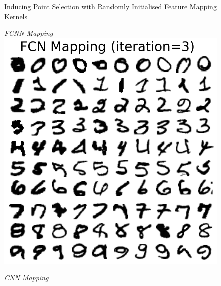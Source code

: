 \documentclass{article}
\numberwithin{equation}{section}
\begin{document}
\begin{figure}[h!]
\begin{minipage}{.25\textwidth}
\end{minipage}%
\caption{Inducing Point Selection with Randomly Initialised Feature Mapping Kernels}\label{fig:mnist-nn-mapping-kernels-0}
\end{figure}

\begin{figure}[h!]
\small
\centering
\begin{minipage}{.25\textwidth}
  \centering
  \textit{FCNN Mapping}
  \includegraphics[width=\linewidth, trim={0 0 0 1.5cm},clip]{thesis-report/figures/custom_mapping/fcn/iteration_3.png}
\end{minipage}%
\begin{minipage}{.25\textwidth}
  \centering
  \textit{CNN Mapping}

\end{minipage}
\end{figure}
\end{document}

